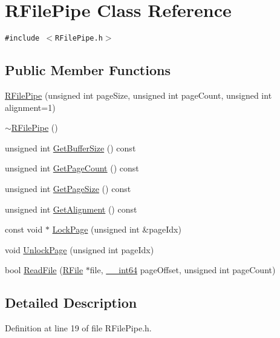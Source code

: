 \hypertarget{class_r_file_pipe}{
\section{RFilePipe Class Reference}
\label{class_r_file_pipe}
}
{\tt \#include $<$RFilePipe.h$>$}

\subsection*{Public Member Functions}
\begin{CompactItemize}
\item 
\hyperlink{class_r_file_pipe_c2106ca425bc38d089de301e7adb517f}{RFilePipe} (unsigned int pageSize, unsigned int pageCount, unsigned int alignment=1)
\item 
\hyperlink{class_r_file_pipe_791787ff76d5b2048d9947683f0e3e28}{$\sim$RFilePipe} ()
\item 
unsigned int \hyperlink{class_r_file_pipe_b272c2bbe5bcc7610fe9abad3e9ac556}{GetBufferSize} () const 
\item 
unsigned int \hyperlink{class_r_file_pipe_c943bb0bd586208d1f031e020bca5750}{GetPageCount} () const 
\item 
unsigned int \hyperlink{class_r_file_pipe_d868c745a9faf08017e716e4e823378e}{GetPageSize} () const 
\item 
unsigned int \hyperlink{class_r_file_pipe_97021368b580fc7e8d90646d9a11ea99}{GetAlignment} () const 
\item 
const void $\ast$ \hyperlink{class_r_file_pipe_73f40320bff78dd2131dff47118a6b61}{LockPage} (unsigned int \&pageIdx)
\item 
void \hyperlink{class_r_file_pipe_a4d2d656640a49f4638891d1db01556d}{UnlockPage} (unsigned int pageIdx)
\item 
bool \hyperlink{class_r_file_pipe_4839f26e007142a7cbfabc765226671f}{ReadFile} (\hyperlink{class_r_file}{RFile} $\ast$file, \hyperlink{common__afx_8h_2e015c96ada30f1fdb9322f7af889c10}{\_\-\_\-int64} pageOffset, unsigned int pageCount)
\end{CompactItemize}


\subsection{Detailed Description}


Definition at line 19 of file RFilePipe.h.

